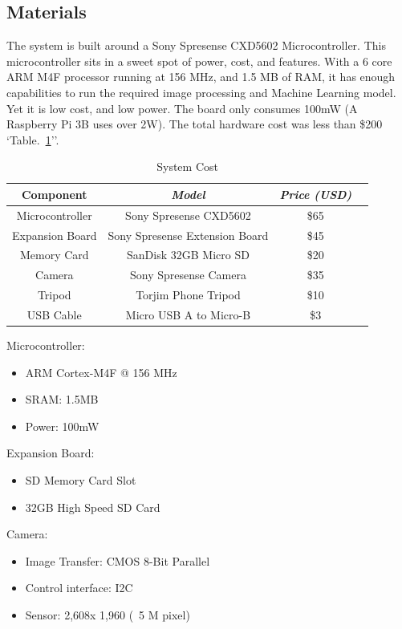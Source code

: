 \documentclass[conference]{IEEEtran}
\begin{document}
\subsection{Materials}

The system is built around a Sony Spresense CXD5602\cite{sony} Microcontroller. This microcontroller sits in a sweet spot of power, cost, and features. With a 6 core ARM M4F processor running at 156 MHz, and 1.5 MB of RAM, it has enough capabilities to run the required image processing and Machine Learning model. Yet it is low cost, and low power. The board only consumes 100mW (A Raspberry Pi 3B uses over 2W). The total hardware cost was less than \$200 `Table.~\ref{sysCost}''.

\begin{table}[htbp]
\caption{System Cost}
\begin{center}
\begin{tabular}{|c|c|c|c|}
\hline
\textbf{Component} & \textbf{\textit{Model}}& \textbf{\textit{Price (USD)}}   \\ \hline 
Microcontroller& Sony Spresense CXD5602 &   \$65\\ \hline 
Expansion Board& Sony Spresense Extension Board & \$45  \\ \hline
Memory Card& SanDisk 32GB Micro SD & \$20  \\ \hline
Camera& Sony Spresense Camera & \$35  \\ \hline
Tripod& Torjim Phone Tripod & \$10  \\ \hline
USB Cable& Micro USB A to Micro-B & \$3  \\ \hline
\end{tabular}
\label{sysCost}
\end{center}
\end{table}

\break
Microcontroller:
\begin{itemize}
	\item ARM Cortex-M4F @ 156 MHz
	\item SRAM: 1.5MB
	\item Power: 100mW
\end{itemize} 
Expansion Board:
\begin{itemize}
	\item SD Memory Card Slot
	\item 32GB High Speed SD Card
\end{itemize} 
Camera:
\begin{itemize}
	\item Image Transfer: CMOS 8-Bit Parallel
	\item Control interface: I2C
	\item Sensor: 2,608x 1,960 (~5 M pixel)
\end{itemize} 
\end{document}
